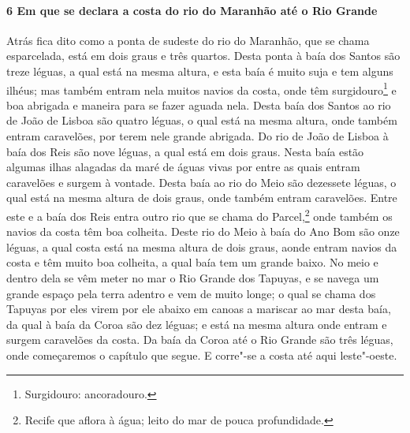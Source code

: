 \begin{linenumbers}
\paragraph{6 Em que se declara a costa do rio do Maranhão até o Rio Grande} \quad
Atrás fica dito como a ponta de sudeste do rio do Maranhão, que se chama esparcelada, está
em dois graus e três quartos. Desta ponta à baía dos Santos são treze léguas, a qual está
na mesma altura, e esta baía é muito suja e tem alguns ilhéus; mas também entram nela
muitos navios da costa, onde têm surgidouro\footnote{Surgidouro: ancoradouro.} e boa abrigada e maneira para se fazer aguada
nela. Desta baía dos Santos ao rio de João de Lisboa são quatro léguas, o qual está na
mesma altura, onde também entram caravelões, por terem nele grande abrigada. Do rio de
João de Lisboa à baía dos Reis são nove léguas, a qual está em dois graus. Nesta baía
estão algumas ilhas alagadas da maré de águas vivas por entre as quais entram caravelões e
surgem à vontade. Desta baía ao rio do Meio são dezessete léguas, o qual está na mesma
altura de dois graus, onde também entram caravelões. Entre este e a baía dos Reis entra
outro rio que se chama do Parcel,\footnote{ Recife que aflora à água; leito do mar de pouca
profundidade.} onde também os navios da costa têm boa colheita. Deste rio do Meio à baía
do Ano Bom são onze léguas, a qual costa está na mesma altura de dois graus, aonde entram
navios da costa e têm muito boa colheita, a qual baía tem um grande baixo. No meio e
dentro dela se vêm meter no mar o Rio Grande dos Tapuyas, e se navega um grande espaço
pela terra adentro e vem de muito longe; o qual se chama dos Tapuyas por eles virem por
ele abaixo em canoas a mariscar ao mar desta baía, da qual à baía da Coroa são dez léguas;
e está na mesma altura onde entram e surgem caravelões da costa. Da baía da Coroa até o
Rio Grande são três léguas, onde começaremos o capítulo que segue. E corre"-se a costa até
aqui leste"-oeste.


\end{linenumbers}
